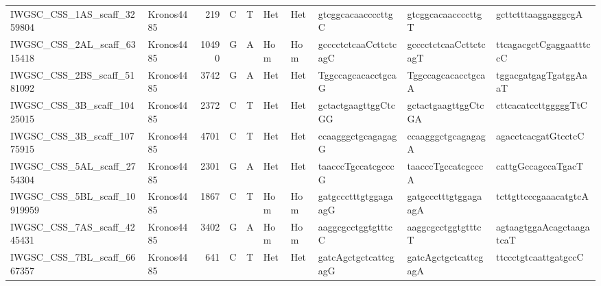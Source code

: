 \begin{longtable}{llrlllllll}
 IWGSC\_CSS\_1AS\_scaff\_3259804  & Kronos4485 &   219 & C    & T     & Het    & Het   & gtcggcacaaccccttgC       & gtcggcacaaccccttgT       & gcttctttaaggagggcgA      \\
 IWGSC\_CSS\_2AL\_scaff\_6315418  & Kronos4485 & 10490 & G    & A     & Hom    & Hom   & gcccctctcaaCcttctcagC    & gcccctctcaaCcttctcagT    & ttcagacgctCgaggaatttccC  \\
 IWGSC\_CSS\_2BS\_scaff\_5181092  & Kronos4485 &  3742 & G    & A     & Het    & Het   & TggccagcacacctgcaG       & TggccagcacacctgcaA       & tggacgatgagTgatggAaaT    \\
 IWGSC\_CSS\_3B\_scaff\_10425015  & Kronos4485 &  2372 & C    & T     & Het    & Het   & gctactgaagttggCtcGG      & gctactgaagttggCtcGA      & cttcacatccttgggggTtC     \\
 IWGSC\_CSS\_3B\_scaff\_10775915  & Kronos4485 &  4701 & C    & T     & Het    & Het   & ccaagggctgcagagagG       & ccaagggctgcagagagA       & agacctcacgatGtcctcC      \\
 IWGSC\_CSS\_5AL\_scaff\_2754304  & Kronos4485 &  2301 & G    & A     & Het    & Het   & taacccTgccatcgcccG       & taacccTgccatcgcccA       & cattgGccagccaTgacT       \\
 IWGSC\_CSS\_5BL\_scaff\_10919959 & Kronos4485 &  1867 & C    & T     & Hom    & Hom   & gatgccctttgtggagaagG     & gatgccctttgtggagaagA     & tcttgttcccgaaacatgtcA    \\
 IWGSC\_CSS\_7AS\_scaff\_4245431  & Kronos4485 &  3402 & G    & A     & Hom    & Hom   & aaggcgcctggtgtttcC       & aaggcgcctggtgtttcT       & agtaagtggaAcagctaagatcaT \\
 IWGSC\_CSS\_7BL\_scaff\_6667357  & Kronos4485 &   641 & C    & T     & Het    & Het   & gatcAgctgctcattcgagG     & gatcAgctgctcattcgagA     & ttccctgtcaattgatgccC     \\
\bottomrule
\end{longtable}
